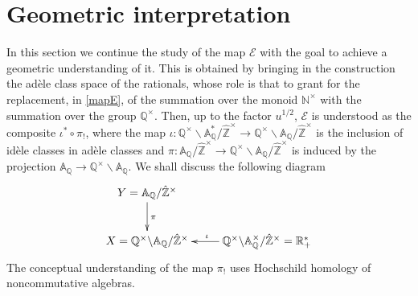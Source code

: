 \documentclass{pspum-l}
\theoremstyle{definition}
\theoremstyle{remark}
\numberwithin{equation}{section}
\def\A{{\mathbb A}}
\def\Q{{\mathbb Q}}
\def\R{{\mathbb R}}
\def\Z{{\mathbb Z}}
\def\cE{{\mathcal E}}
\def\hatz{{\hat\Z^\times}}
\def\nt{\N^{\times}}
\def\N{{\mathbb N}}
\begin{document}
\section{Geometric interpretation}\label{sectgeom}
In this section we  continue the study of the map $\cE$ with the goal to achieve a geometric understanding of it. This is obtained by bringing in the construction the ad\`ele class space of the rationals, whose role  is that to grant  for the replacement, in \eqref{mapE}, of  the summation over the monoid $\nt$  with the summation over the group $\Q^\times$. Then, up to the factor $u^{1/2}$, $\cE$ is understood as  the composite $\iota^*\circ \pi_!$, where the map $\iota:\Q^\times\backslash\A^*_\Q/\hatz\to \Q^\times\backslash \A_\Q/\hatz$ is the inclusion of id\`ele classes in ad\`ele classes and  $\pi:\A_\Q/\hatz\to \Q^\times\backslash \A_\Q/\hatz$ is induced by the projection $\A_\Q\to \Q^\times\backslash \A_\Q$. We shall discuss the following diagram  
\begin{equation*}\label{mapE1}
\xymatrix{ Y=\A_\Q/\hatz  \ar[d]^\pi &  \\
X=\Q^\times\backslash \A_\Q/\hatz  & \Q^\times\backslash \A^\times_\Q/\hatz=\R_+^*\ar[l]_{\iota} }
           \end{equation*}
 The conceptual understanding of the map $\pi_!$ uses Hochschild homology of noncommutative algebras.  
 
\end{document}
